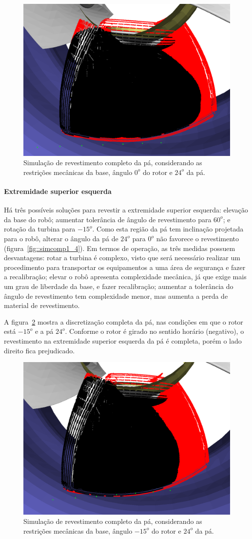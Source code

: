 \begin{figure}[!ht]
	\centering	
	\includegraphics[width=.5\columnwidth]{figs/simcomp1_1.png}
	\caption{Simulação de revestimento completo da pá, considerando as
	restrições mecânicas da base, ângulo $0^o$ do rotor e $24^o$ da pá.}
	\label{fig::simcomp1_1}
\end{figure}

\paragraph{Extremidade superior esquerda}
Há três possíveis soluções para revestir a extremidade superior esquerda:
elevação da base do robô; aumentar tolerância de ângulo de revestimento para
$60^o$; e rotação da turbina para $-15^o$. Como esta
região da pá tem inclinação projetada para o robô, alterar o ângulo da pá de $24^o$ para $0^o$ não favorece o
revestimento (figura~\ref{fig::simcomp1_4}). Em termos de operação, as três
medidas possuem desvantagens: rotar a turbina é complexo, visto que será
necessário realizar um procedimento para transportar os equipamentos a uma área
de segurança e fazer a recalibração; elevar o robô apresenta complexidade
mecânica, já que exige mais um grau de liberdade da base, e fazer recalibração;
aumentar a tolerância do ângulo de revestimento tem complexidade menor, mas
aumenta a perda de material de revestimento.

A figura~\ref{fig::simcomp1_5} mostra a discretização completa da pá, nas
condições em que o rotor está $-15^o$ e a pá $24^o$. Conforme o rotor é
girado no sentido horário (negativo), o revestimento na extremidade superior
esquerda da pá é completa, porém o lado direito fica prejudicado.

\begin{figure}[!ht]
	\centering	
	\includegraphics[width=.5\columnwidth]{figs/simcomp1_5.png}
	\caption{Simulação de revestimento completo da pá, considerando as
	restrições mecânicas da base, ângulo $-15^o$ do rotor e $24^o$ da pá.}
	\label{fig::simcomp1_5}
\end{figure}

